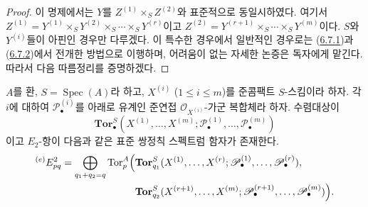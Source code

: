 \begin{proof}
이 명제에서는 $Y$를 $Z^{(1)}\times_S Z^{(2)}$와 표준적으로
동일시하였다. 여기서
$Z^{(1)}=Y^{(1)}\times_S Y^{(2)}\times_S\cdots\times_S Y^{(r)}$이고
$Z^{(2)}=Y^{(r+1)}\times_S\cdots\times_S Y^{(m)}$이다. $S$와
$Y^{(i)}$들이 아핀인 경우만 다루겠다. 이 특수한 경우에서 일반적인
경우로는 (\hyperref[III.6.7.1-fr]{6.7.1})과
(\hyperref[III.6.7.2-fr]{6.7.2})에서 전개한 방법으로 이행하며,
어려움이 없는 자세한 논증은 독자에게 맡긴다. 따라서 다음 따름정리를
증명하겠다.
\end{proof}

\begin{corollary}[6.8.3]
\label{III.6.8.3-fr}
$A$를 환, $S=\operatorname{Spec}(A)$라 하고, $X^{(i)}$
($1\leq i\leq m$)를 준콤팩트 $S$-스킴이라 하자. 각 $i$에 대하여
$\mathscr P_\bullet^{(i)}$를 아래로 유계인 준연접
$\mathscr O_{X^{(i)}}$-가군 복합체라 하자. 수렴대상이
\[
  \mathbf{Tor}_\bullet^S
  (X^{(1)},\ldots,X^{(m)};
   \mathscr P_\bullet^{(1)},\ldots,\mathscr P_\bullet^{(m)})
\]
이고 $E_2$-항이 다음과 같은 표준 쌍정칙 스펙트럼 함자가 존재한다.
\[
\begin{split}
  {}^{(e)}E_{pq}^2
  =\bigoplus_{q_1+q_2=q}
  \operatorname{Tor}_p^A\Bigl(
  &\mathbf{Tor}_{q_1}^S
  (X^{(1)},\ldots,X^{(r)};
   \mathscr P_\bullet^{(1)},\ldots,\mathscr P_\bullet^{(r)}),\\
  &\mathbf{Tor}_{q_2}^S
  (X^{(r+1)},\ldots,X^{(m)};
   \mathscr P_\bullet^{(r+1)},\ldots,\mathscr P_\bullet^{(m)})
  \Bigr).
\end{split}
\]
\end{corollary}

